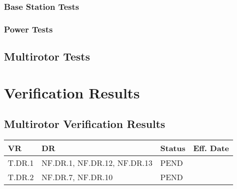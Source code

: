 \documentclass[10pt,letterpaper]{article}
\begin{document}
\subsubsection{Base Station Tests}
\subsubsection{Power Tests}

\subsection{Multirotor Tests}


\section{Verification Results}
\subsection{Multirotor Verification Results}
\begin{table}[H]
	\centering
	\begin{tabular}{llll}
	\hline
	\textbf{VR} & \textbf{DR} & \textbf{Status} & \textbf{Eff. Date} \\
	\hline
	T.DR.1 & NF.DR.1, NF.DR.12, NF.DR.13  & PEND   & \\
	T.DR.2 & NF.DR.7, NF.DR.10 & PEND   & \\
	\hline
	\end{tabular}
\end{table}

\clearpage
{}



\end{document}
